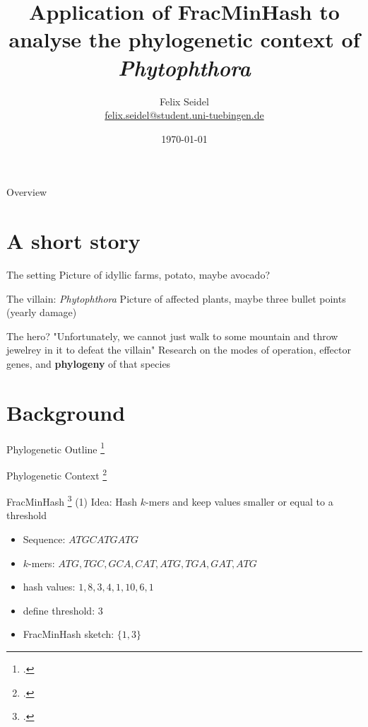 \documentclass[aspectratio=169]{beamer}
\title{Application of FracMinHash to analyse the phylogenetic context of \textit{Phytophthora}}
\date{\today}
\author{ Felix Seidel \\
\href{mailto:felix.seidel@student.uni-tuebingen.de}{felix.seidel@student.uni-tuebingen.de}
}
\begin{document}
\maketitle

\begin{frame}{Overview}
    \tableofcontents
\end{frame}

\section{A short story}
\begin{frame}{The setting}
    Picture of idyllic farms, potato, maybe avocado?
\end{frame}

\begin{frame}{The villain: \textit{Phytophthora}}
    Picture of affected plants, maybe three bullet points (yearly damage)
\end{frame}

\begin{frame}{The hero?}
    "Unfortunately, we cannot just walk to some mountain and throw jewelrey in
    it to defeat the villain" Research on the modes of operation, effector
    genes, and \textbf{phylogeny} of that species
\end{frame}

\section{Background}
\begin{frame}{Phylogenetic Outline \footcite{bryantNeighborNetImprovedAlgorithms2023,bagciMicrobialPhylogeneticContext2021}}
    
\end{frame}

\begin{frame}{Phylogenetic Context \footcite{bagciMicrobialPhylogeneticContext2021}}
    
\end{frame}

\begin{frame}{FracMinHash \footcite{irberLightweightCompositionalAnalysis2022} (1)}
    Idea: Hash $k$-mers and keep values smaller or equal to a threshold
    \begin{itemize}[<+->]
        \item Sequence: $ATGCATGATG$
        \item $k$-mers: $ATG, TGC, GCA, CAT, ATG, TGA, GAT, ATG$
        \item hash values: $1, 8, 3, 4, 1, 10, 6, 1$
        \item define threshold: $3$
        \item FracMinHash sketch: $\{1, 3\}$
    \end{itemize}
\end{frame}
\end{document}
